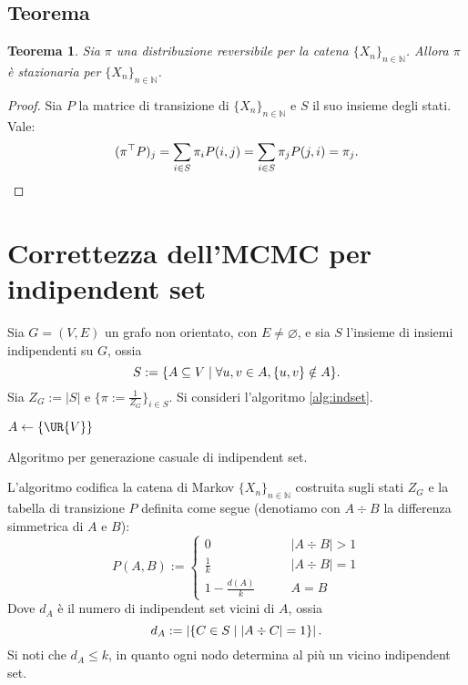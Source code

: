 \documentclass{article}
\theoremstyle{plain}
\newtheorem{thm}{Teorema}
\newcommand{\asn}{\leftarrow}
\newcommand{\N}{\mathbb N}
\newcommand{\tra}{^\top}
\newcommand{\chain}[1]{\{#1_n\}_{n\in\N}}
\newcommand{\card}[1]{\left|#1\right|}
\renewcommand{\emptyset}{\varnothing}
\begin{document}
\subsection{Teorema}

\begin{thm}
	Sia $\pi$ una distribuzione reversibile per la catena $\chain{X}$. Allora $\pi$ è stazionaria per $\chain X$.
\end{thm}
\begin{proof}
	Sia $P$ la matrice di transizione di $\chain X$ e $S$ il suo insieme degli stati. Vale:
	\begin{equation*}
		(\pi\tra P)_j = \sum_{i\in S} \pi_i P(i,j) = \sum_{i\in S} \pi_j P(j,i) = \pi_j \text. \qedhere
	\end{equation*}
\end{proof}



\section{Correttezza dell'MCMC per indipendent set}

Sia $G=(V,E)$ un grafo non orientato, con $E\ne\emptyset$, e sia $S$ l'insieme di insiemi indipendenti su $G$, ossia
\begin{equation*}
	S := \{A\subseteq V\mid \forall u,v\in A, \{u,v\}\notin A\} \text.
\end{equation*}
Sia $Z_G:=\card S$ e $\{\pi:=\frac{1}{Z_G}\}_{i\in S}$. Si consideri l'algoritmo \ref{alg:indset}.

\begin{algorithm}
	\DontPrintSemicolon

	$A\asn\{\UR{V}\}$

	\For{$n$ volte}{
		$V\asn\UR{V}$ \;
		\If{$V\in A$}{
			$A\asn A\setminus\{v\}$ \;
		}\ElseIf{$\forall z\in A\quad \{z,v\}\notin E$}{
			$A\asn A\cup\{v\}$ \;
		}
	}
	 \;

	\caption{Algoritmo per generazione casuale di indipendent set.}
	\label{alg:indset}
\end{algorithm}

L'algoritmo codifica la catena di Markov $\chain X$ costruita sugli stati $Z_G$ e la tabella di transizione $P$ definita come segue (denotiamo con $A\div B$ la differenza simmetrica di $A$ e $B$):
\begin{equation*}
	P(A,B):=\begin{cases}
		0                  & \qquad \card{A\div B}>1 \\
		\frac 1 k          & \qquad \card{A\div B}=1 \\
		1 - \frac{d(A)}{k} & \qquad A=B
	\end{cases}
\end{equation*}
Dove $d_A$ è il numero di indipendent set vicini di $A$, ossia
\begin{equation*}
	d_A:=\card{\{C\in S\mid \card{A\div C}=1\}} \text.
\end{equation*}
Si noti che $d_A\le k$, in quanto ogni nodo determina al più un vicino indipendent set.
\end{document}
